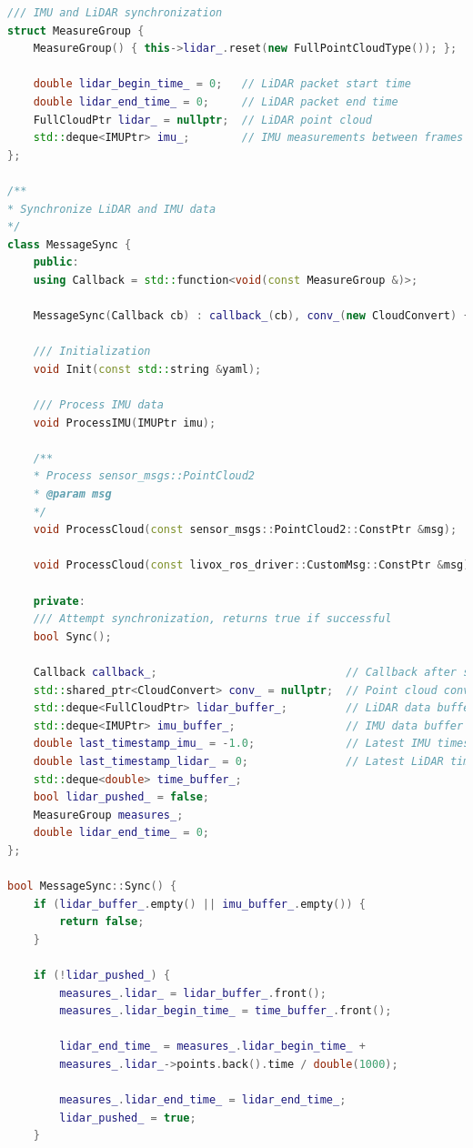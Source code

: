 \begin{lstlisting}[language=c++,caption=src/ch7/loosly_coupled_lio/measure_sync.h]
/// IMU and LiDAR synchronization
struct MeasureGroup {
	MeasureGroup() { this->lidar_.reset(new FullPointCloudType()); };
	
	double lidar_begin_time_ = 0;   // LiDAR packet start time
	double lidar_end_time_ = 0;     // LiDAR packet end time
	FullCloudPtr lidar_ = nullptr;  // LiDAR point cloud
	std::deque<IMUPtr> imu_;        // IMU measurements between frames
};

/**
* Synchronize LiDAR and IMU data
*/
class MessageSync {
	public:
	using Callback = std::function<void(const MeasureGroup &)>;
	
	MessageSync(Callback cb) : callback_(cb), conv_(new CloudConvert) {}
	
	/// Initialization
	void Init(const std::string &yaml);
	
	/// Process IMU data
	void ProcessIMU(IMUPtr imu);
	
	/**
	* Process sensor_msgs::PointCloud2
	* @param msg
	*/
	void ProcessCloud(const sensor_msgs::PointCloud2::ConstPtr &msg);
	
	void ProcessCloud(const livox_ros_driver::CustomMsg::ConstPtr &msg);
	
	private:
	/// Attempt synchronization, returns true if successful
	bool Sync();
	
	Callback callback_;                             // Callback after synchronization
	std::shared_ptr<CloudConvert> conv_ = nullptr;  // Point cloud converter
	std::deque<FullCloudPtr> lidar_buffer_;         // LiDAR data buffer
	std::deque<IMUPtr> imu_buffer_;                 // IMU data buffer
	double last_timestamp_imu_ = -1.0;              // Latest IMU timestamp
	double last_timestamp_lidar_ = 0;               // Latest LiDAR timestamp
	std::deque<double> time_buffer_;
	bool lidar_pushed_ = false;
	MeasureGroup measures_;
	double lidar_end_time_ = 0;
};

bool MessageSync::Sync() {
	if (lidar_buffer_.empty() || imu_buffer_.empty()) {
		return false;
	}
	
	if (!lidar_pushed_) {
		measures_.lidar_ = lidar_buffer_.front();
		measures_.lidar_begin_time_ = time_buffer_.front();
		
		lidar_end_time_ = measures_.lidar_begin_time_ + 
		measures_.lidar_->points.back().time / double(1000);
		
		measures_.lidar_end_time_ = lidar_end_time_;
		lidar_pushed_ = true;
	}
	

\end{lstlisting}
